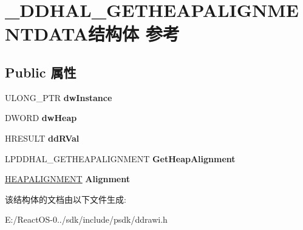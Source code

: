 \hypertarget{struct___d_d_h_a_l___g_e_t_h_e_a_p_a_l_i_g_n_m_e_n_t_d_a_t_a}{}\section{\+\_\+\+D\+D\+H\+A\+L\+\_\+\+G\+E\+T\+H\+E\+A\+P\+A\+L\+I\+G\+N\+M\+E\+N\+T\+D\+A\+T\+A结构体 参考}
\label{struct___d_d_h_a_l___g_e_t_h_e_a_p_a_l_i_g_n_m_e_n_t_d_a_t_a}
\subsection*{Public 属性}
\begin{DoxyCompactItemize}
\item 
\mbox{\label{struct___d_d_h_a_l___g_e_t_h_e_a_p_a_l_i_g_n_m_e_n_t_d_a_t_a_ac055d5edae11da6eb5431b7db5998d70}} 
U\+L\+O\+N\+G\+\_\+\+P\+TR {\bfseries dw\+Instance}
\item 
\mbox{\label{struct___d_d_h_a_l___g_e_t_h_e_a_p_a_l_i_g_n_m_e_n_t_d_a_t_a_ac955496d88420c1b1f2a4cc60a7e633f}} 
D\+W\+O\+RD {\bfseries dw\+Heap}
\item 
\mbox{\label{struct___d_d_h_a_l___g_e_t_h_e_a_p_a_l_i_g_n_m_e_n_t_d_a_t_a_aae1e8e8624a3a3089c9e1dba54a9bf09}} 
H\+R\+E\+S\+U\+LT {\bfseries dd\+R\+Val}
\item 
\mbox{\label{struct___d_d_h_a_l___g_e_t_h_e_a_p_a_l_i_g_n_m_e_n_t_d_a_t_a_a5dcf4ed7bb44cfdee1b9cddf84fc4c4a}} 
L\+P\+D\+D\+H\+A\+L\+\_\+\+G\+E\+T\+H\+E\+A\+P\+A\+L\+I\+G\+N\+M\+E\+NT {\bfseries Get\+Heap\+Alignment}
\item 
\mbox{\label{struct___d_d_h_a_l___g_e_t_h_e_a_p_a_l_i_g_n_m_e_n_t_d_a_t_a_a2de6714394b49b2ff09138717084715d}} 
\hyperlink{struct___h_e_a_p_a_l_i_g_n_m_e_n_t}{H\+E\+A\+P\+A\+L\+I\+G\+N\+M\+E\+NT} {\bfseries Alignment}
\end{DoxyCompactItemize}


该结构体的文档由以下文件生成\+:\begin{DoxyCompactItemize}
\item 
E\+:/\+React\+O\+S-\/0../sdk/include/psdk/ddrawi.\+h\end{DoxyCompactItemize}
